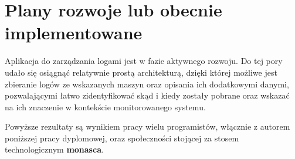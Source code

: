 \section{Plany rozwoje lub obecnie implementowane}
\label{chapter:application:plans}

Aplikacja do zarządzania logami jest w fazie aktywnego rozwoju. 
Do tej pory udało się osiągnąć relatywnie prostą architekturą, dzięki której
możliwe jest zbieranie logów ze wskazanych maszyn oraz opisania ich
dodatkowymi danymi, pozwalającymi łatwo zidentyfikować skąd i kiedy
zostały pobrane oraz wskazać na ich znaczenie w kontekście monitorowanego systemu.

Powyższe rezultaty są wynikiem pracy wielu programistów, włącznie z autorem poniższej
pracy dyplomowej, oraz społeczności stojącej za stosem technologicznym \textbf{monasca}.



